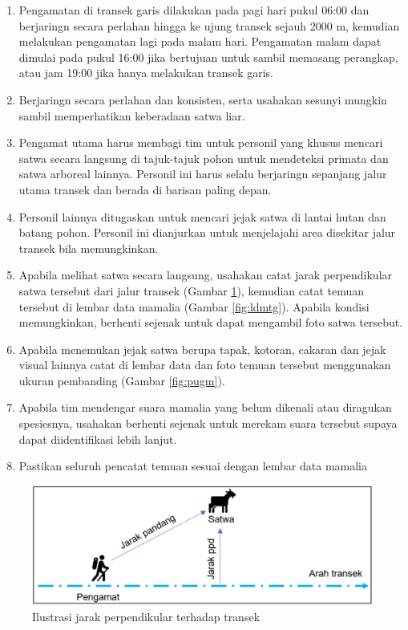 \documentclass[
]{book}
\providecommand{\tightlist}{%
  \setlength{\itemsep}{0pt}\setlength{\parskip}{0pt}}
\begin{document}
\begin{enumerate}
\def\labelenumi{\arabic{enumi}.}
\tightlist
\item
  Pengamatan di transek garis dilakukan pada pagi hari pukul 06:00 dan berjaringn secara perlahan hingga ke ujung transek sejauh 2000 m, kemudian melakukan pengamatan lagi pada malam hari. Pengamatan malam dapat dimulai pada pukul 16:00 jika bertujuan untuk sambil memasang perangkap, atau jam 19:00 jika hanya melakukan transek garis.
\item
  Berjaringn secara perlahan dan konsisten, serta usahakan sesunyi mungkin sambil memperhatikan keberadaan satwa liar.
\item
  Pengamat utama harus membagi tim untuk personil yang khusus mencari satwa secara langsung di tajuk-tajuk pohon untuk mendeteksi primata dan satwa arboreal lainnya. Personil ini harus selalu berjaringn sepanjang jalur utama transek dan berada di barisan paling depan.
\item
  Personil lainnya ditugaskan untuk mencari jejak satwa di lantai hutan dan batang pohon. Personil ini dianjurkan untuk menjelajahi area disekitar jalur transek bila memungkinkan.
\item
  Apabila melihat satwa secara langsung, usahakan catat jarak perpendikular satwa tersebut dari jalur transek (Gambar \ref{fig:figppd}), kemudian catat temuan tersebut di lembar data mamalia (Gambar \ref{fig:ldmtg}). Apabila kondisi memungkinkan, berhenti sejenak untuk dapat mengambil foto satwa tersebut.
\item
  Apabila menemukan jejak satwa berupa tapak, kotoran, cakaran dan jejak visual lainnya catat di lembar data dan foto temuan tersebut menggunakan ukuran pembanding (Gambar \ref{fig:pugm}).
\item
  Apabila tim mendengar suara mamalia yang belum dikenali atau diragukan spesiesnya, usahakan berhenti sejenak untuk merekam suara tersebut supaya dapat diidentifikasi lebih lanjut.
\item
  Pastikan seluruh pencatat temuan sesuai dengan lembar data mamalia
\end{enumerate}

\begin{figure}

{\centering \includegraphics[width=1\linewidth]{images/ppd_ilustration} 

}

\caption{Ilustrasi jarak perpendikular terhadap transek}\label{fig:figppd}
\end{figure}
\end{document}
